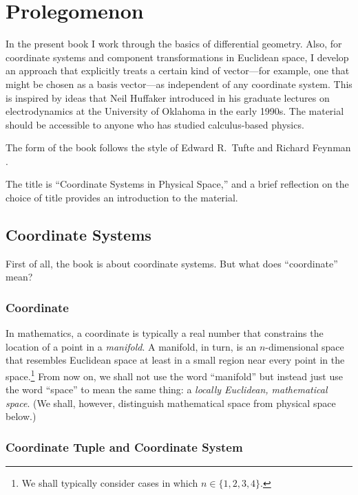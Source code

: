 \cleardoublepage
\chapter*{Prolegomenon}

In the present book I work through the basics of differential geometry.  Also,
for coordinate systems and component transformations in Euclidean space, I
develop an approach that explicitly treats a certain kind of vector---for
example, one that might be chosen as a basis vector---as independent of any
coordinate system.  This is inspired by ideas that Neil Huffaker introduced in
his graduate lectures on electrodynamics at the University of Oklahoma in the
early 1990s.  The material should be accessible to anyone who has studied
calculus-based physics.

The form of the book follows the style of Edward R.~Tufte and Richard Feynman
\citep{pkg-tufte}.

The title is ``Coordinate Systems in Physical Space,'' and a brief reflection
on the choice of title provides an introduction to the material.

\section{Coordinate Systems}

First of all, the book is about coordinate systems.  But what does
``coordinate'' mean?

\subsection{Coordinate}

In mathematics, a coordinate is typically a real number that constrains the
location of a point in a \emph{manifold}.  A manifold, in turn, is an
$n$-dimensional space that resembles Euclidean space at least in a small region
near every point in the space.\footnote{%
   We shall typically consider cases in which $n \in \{1, 2, 3, 4\}$.%
}
From now on, we shall not use the word ``manifold'' but instead just use the
word ``space'' to mean the same thing: a \emph{locally Euclidean, mathematical
space}.  (We shall, however, distinguish mathematical space from physical space
below.)

\subsection{Coordinate Tuple and Coordinate System}


